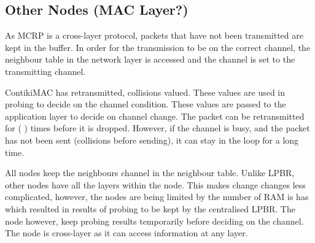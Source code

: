 \subsection{Other Nodes (MAC Layer?)}
As MCRP is a cross-layer protocol, packets that have not been transmitted are kept in the buffer. In order for the transmission to be on the correct channel, the neighbour table in the network layer is accessed and the channel is set to the transmitting channel. 

ContikiMAC has retransmitted, collisions valued. These values are used in probing to decide on the channel condition. These values are passed to the application layer to decide on channel change. The packet can be retransmitted for ( ) times before it is dropped. However, if the channel is busy, and the packet has not been sent (collisions before sending), it can stay in the loop for a long time.

All nodes keep the neighbours channel in the neighbour table. Unlike LPBR, other nodes have all the layers within the node. This makes change changes less complicated, however, the nodes are being limited by the number of RAM is has which resulted in results of probing to be kept by the centralised LPBR. The node however, keep probing results temporarily before deciding on the channel. The node is cross-layer as it can access information at any layer.

